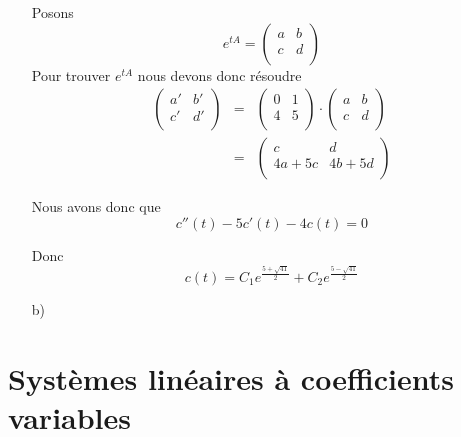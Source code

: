 \documentclass{article}
\begin{document}
\begin{enumerate}
    Posons
    \begin{equation}
      e^{tA}= \left(
        \begin{matrix}
          a&b \\
          c&d \\
        \end{matrix}
      \right)
    \end{equation}
    Pour trouver $e^{tA}$ nous devons donc résoudre
    \begin{eqnarray*}
      \left(
        \begin{matrix}
          a'&b' \\
          c'&d' \\
        \end{matrix}
      \right) &=&\left(
        \begin{matrix}
          0&1 \\
          4&5 \\
        \end{matrix}
      \right) \cdot\left( \begin{matrix}
          a&b \\
          c&d \\
        \end{matrix}
      \right)\\
      &=& \left(
      \begin{matrix}
        c&d \\
        4a+5c&4b+5d \\
      \end{matrix}
    \right)
  \end{eqnarray*}

  Nous avons donc que
  \begin{equation}
    c''(t) -5c'(t) -4c(t)=0
  \end{equation}

  Donc
  \begin{equation}
    c(t) = C_1 e^{\frac{5+\sqrt{41}}{2}} + C_2 e^{\frac{5-\sqrt{41}}{2}}
  \end{equation}



\item[b)]
\end{enumerate}


\section{Systèmes linéaires à coefficients variables}
\end{document}
